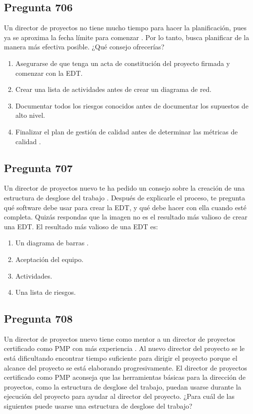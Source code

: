 \documentclass[11pt,a4paper]{article}
\begin{document}
\subsection*{Pregunta 706}
Un director de proyectos no tiene mucho tiempo para hacer la planificación, pues ya se aproxima la fecha límite para comenzar . Por lo tanto, busca planificar de la manera más efectiva posible. ¿Qué consejo ofrecerías?

\begin{enumerate}[label=\alph*)]
  \item Asegurarse de que tenga un acta de constitución del proyecto firmada y comenzar con la EDT.
  \item Crear una lista de actividades antes de crear un diagrama de red.
  \item Documentar todos los riesgos conocidos antes de documentar los supuestos de alto nivel.
  \item Finalizar el plan de gestión de calidad antes de determinar las métricas de calidad .
\end{enumerate}

\subsection*{Pregunta 707}
Un director de proyectos nuevo te ha pedido un consejo sobre la creación de una estructura de desglose del trabajo . Después de explicarle el proceso, te pregunta qué software debe usar para crear la EDT, y qué debe hacer con ella cuando esté completa. Quizás respondas que la imagen no es el resultado más valioso de crear una EDT. El resultado más valioso de una EDT es:

\begin{enumerate}[label=\alph*)]
  \item Un diagrama de barras .
  \item Aceptación del equipo.
  \item Actividades.
  \item Una lista de riesgos.
\end{enumerate}

\subsection*{Pregunta 708}
Un director de proyectos nuevo tiene como mentor a un director de proyectos certificado como PMP con más experiencia . Al nuevo director del proyecto se le está dificultando encontrar tiempo suficiente para dirigir el proyecto porque el alcance del proyecto se está elaborando progresivamente. El director de proyectos certificado como PMP aconseja que las herramientas básicas para la dirección de proyectos, como la estructura de desglose del trabajo, puedan usarse durante la ejecución del proyecto para ayudar al director del proyecto. ¿Para cuál de las siguientes puede usarse una estructura de desglose del trabajo?
\end{document}
